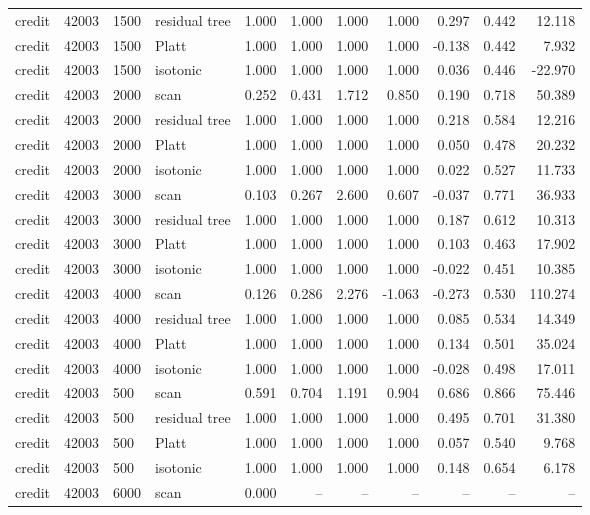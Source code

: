 \begin{tabular}{lrllrrrrrrr}
credit & 42003 & 1500 & residual tree & 1.000 & 1.000 & 1.000 & 1.000 & 0.297 & 0.442 & 12.118 \\
credit & 42003 & 1500 & Platt & 1.000 & 1.000 & 1.000 & 1.000 & -0.138 & 0.442 & 7.932 \\
credit & 42003 & 1500 & isotonic & 1.000 & 1.000 & 1.000 & 1.000 & 0.036 & 0.446 & -22.970 \\
credit & 42003 & 2000 & scan & 0.252 & 0.431 & 1.712 & 0.850 & 0.190 & 0.718 & 50.389 \\
credit & 42003 & 2000 & residual tree & 1.000 & 1.000 & 1.000 & 1.000 & 0.218 & 0.584 & 12.216 \\
credit & 42003 & 2000 & Platt & 1.000 & 1.000 & 1.000 & 1.000 & 0.050 & 0.478 & 20.232 \\
credit & 42003 & 2000 & isotonic & 1.000 & 1.000 & 1.000 & 1.000 & 0.022 & 0.527 & 11.733 \\
credit & 42003 & 3000 & scan & 0.103 & 0.267 & 2.600 & 0.607 & -0.037 & 0.771 & 36.933 \\
credit & 42003 & 3000 & residual tree & 1.000 & 1.000 & 1.000 & 1.000 & 0.187 & 0.612 & 10.313 \\
credit & 42003 & 3000 & Platt & 1.000 & 1.000 & 1.000 & 1.000 & 0.103 & 0.463 & 17.902 \\
credit & 42003 & 3000 & isotonic & 1.000 & 1.000 & 1.000 & 1.000 & -0.022 & 0.451 & 10.385 \\
credit & 42003 & 4000 & scan & 0.126 & 0.286 & 2.276 & -1.063 & -0.273 & 0.530 & 110.274 \\
credit & 42003 & 4000 & residual tree & 1.000 & 1.000 & 1.000 & 1.000 & 0.085 & 0.534 & 14.349 \\
credit & 42003 & 4000 & Platt & 1.000 & 1.000 & 1.000 & 1.000 & 0.134 & 0.501 & 35.024 \\
credit & 42003 & 4000 & isotonic & 1.000 & 1.000 & 1.000 & 1.000 & -0.028 & 0.498 & 17.011 \\
credit & 42003 & 500 & scan & 0.591 & 0.704 & 1.191 & 0.904 & 0.686 & 0.866 & 75.446 \\
credit & 42003 & 500 & residual tree & 1.000 & 1.000 & 1.000 & 1.000 & 0.495 & 0.701 & 31.380 \\
credit & 42003 & 500 & Platt & 1.000 & 1.000 & 1.000 & 1.000 & 0.057 & 0.540 & 9.768 \\
credit & 42003 & 500 & isotonic & 1.000 & 1.000 & 1.000 & 1.000 & 0.148 & 0.654 & 6.178 \\
credit & 42003 & 6000 & scan & 0.000 & -- & -- & -- & -- & -- & -- \\

\end{tabular}
